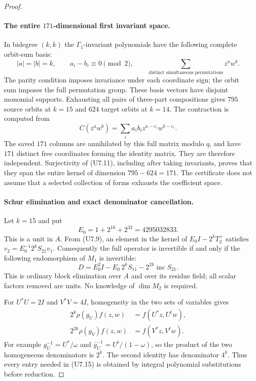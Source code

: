 \begin{proof}
\paragraph{The entire $171$-dimensional first invariant space.}
In bidegree $(k,k)$ the $\Gamma_1$-invariant polynomials have the
following complete orbit-sum basis:
\[
 |a|=|b|=k,\qquad a_i-b_i\equiv0\pmod2,
 \qquad
 \sum_{\text{distinct simultaneous permutations}}z^a w^b.
 \tag{U7.14}
\]
The parity condition imposes invariance under each coordinate sign;
the orbit sum imposes the full permutation group. These basis
vectors have disjoint monomial supports. Exhausting all pairs of
three-part compositions gives $795$ source orbits at $k=15$ and
$624$ target orbits at $k=14$. The contraction is computed from
\[
 C(z^aw^b)=\sum_i a_i b_i z^{a-e_i}w^{b-e_i}.
\]
The saved $171$ columns are annihilated by this full matrix modulo
$q$, and have $171$ distinct free coordinates forming the identity
matrix. They are therefore independent. Surjectivity of (U7.11),
including after taking invariants, proves that they span the entire
kernel of dimension $795-624=171$. The certificate does not assume
that a selected collection of forms exhausts the coefficient space.

\paragraph{Schur elimination and exact denominator cancellation.}
Let $k=15$ and put
\[
 E_0=1+2^{16}+2^{32}=4295032833.
\]
This is a unit in $A$. From (U7.9), an element in the kernel of
$E_0I-2^kT_2^+$ satisfies
$v_2=E_0^{-1}2^kS_{21}v_1$. Consequently the full operator is
invertible if and only if the following endomorphism of $M_1$ is
invertible:
\[
 D=E_0^2I-E_0\,2^kS_{11}
                  -2^{2k}\operatorname{inc}S_{21}.
 \tag{U7.15}
\]
This is ordinary block elimination over $A$ and over its residue
field; all scalar factors removed are units. No knowledge of
$\dim M_2$ is required.

For $U^*U=2I$ and $V^*V=4I$, homogeneity in the two sets of
variables gives
\[
 \begin{split}
 2^k\rho(g_U)f(z,w)&=f(U^*z,U^tw),\\
 2^{2k}\rho(g_V)f(z,w)&=f(V^*z,V^tw).
 \end{split}
 \tag{U7.16}
\]
For example $g_U^{-1}=U^*/\omega$ and
$\overline g_U^{-1}=U^t/(1-\omega)$, so the product of the two
homogeneous denominators is $2^k$. The second identity has
denominator $4^k$. Thus every entry needed in (U7.15) is obtained
by integral polynomial substitutions before reduction.


\end{proof}
